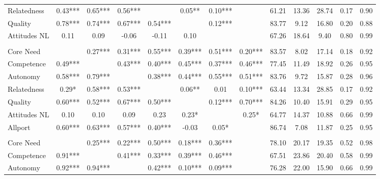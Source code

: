 \begin{table}
\begin{minipage}[t][\textheight][t]{\textwidth}
{\begin{tabular}[t]{lcccccccccccc}
\hspace{1em}Relatedness & 0.43*** & 0.65*** & 0.56*** &  & 0.05** & 0.10*** &  & 61.21 & 13.36 & 28.74 & 0.17 & 0.90\\
\hspace{1em}Quality & 0.78*** & 0.74*** & 0.67*** & 0.54*** &  & 0.12*** &  & 83.77 & 9.12 & 16.80 & 0.20 & 0.88\\
\hspace{1em}Attitudes NL & 0.11 & 0.09 & -0.06 & -0.11 & 0.10 &  &  & 67.26 & 18.64 & 9.40 & 0.80 & 0.99\\
\addlinespace[0.3em]
\multicolumn{13}{l}{\textbf{Study 3}}\\
\hspace{1em}Core Need &  & 0.27*** & 0.31*** & 0.55*** & 0.39*** & 0.51*** & 0.20*** & 83.57 & 8.02 & 17.14 & 0.18 & 0.92\\
\hspace{1em}Competence & 0.49*** &  & 0.43*** & 0.40*** & 0.45*** & 0.37*** & 0.46*** & 77.45 & 11.49 & 18.92 & 0.26 & 0.95\\
\hspace{1em}Autonomy & 0.58*** & 0.79*** &  & 0.38*** & 0.44*** & 0.55*** & 0.51*** & 83.76 & 9.72 & 15.87 & 0.28 & 0.96\\
\hspace{1em}Relatedness & 0.29* & 0.58*** & 0.53*** &  & 0.06** & 0.01 & 0.10*** & 63.44 & 13.34 & 28.85 & 0.17 & 0.92\\
\hspace{1em}Quality & 0.60*** & 0.52*** & 0.67*** & 0.50*** &  & 0.12*** & 0.70*** & 84.26 & 10.40 & 15.91 & 0.29 & 0.95\\
\hspace{1em}Attitudes NL & 0.10 & 0.10 & 0.09 & 0.23 & 0.23* &  & 0.25* & 64.77 & 14.37 & 10.88 & 0.66 & 0.99\\
\hspace{1em}Allport & 0.60*** & 0.63*** & 0.57*** & 0.40*** & -0.03 & 0.05* &  & 86.74 & 7.08 & 11.87 & 0.25 & 0.95\\
\addlinespace[0.3em]
\multicolumn{13}{l}{\textbf{Across Studies}}\\
\hspace{1em}Core Need &  & 0.25*** & 0.22*** & 0.50*** & 0.18*** & 0.36*** &  & 78.10 & 20.17 & 19.35 & 0.52 & 0.98\\
\hspace{1em}Competence & 0.91*** &  & 0.41*** & 0.33*** & 0.39*** & 0.46*** &  & 67.51 & 23.86 & 20.40 & 0.58 & 0.99\\
\hspace{1em}Autonomy & 0.92*** & 0.94*** &  & 0.42*** & 0.10*** & 0.09*** &  & 76.28 & 22.00 & 15.90 & 0.66 & 0.99\\

\end{tabular}}
\end{minipage}
\end{table}
